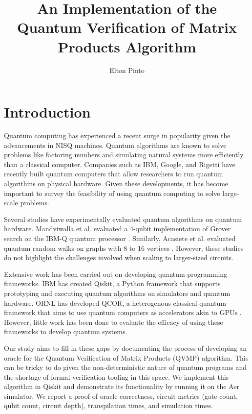 \documentclass[11pt]{article}
\title{An Implementation of the Quantum Verification of Matrix Products Algorithm}
\author{Elton Pinto}
\date{}
\theoremstyle{definition}
\theoremstyle{remark}
\begin{document}
\maketitle

\section{Introduction}

Quantum computing has experienced a recent surge in popularity given the
advancements in NISQ machines. Quantum algorithms are known to solve problems
like factoring numbers and simulating natural systems more efficiently than a
classical computer. Companies such as IBM, Google, and Rigetti have recently
built quantum computers that allow researchers to run quantum algorithms on
physical hardware. Given these developments, it has become important to survey
the feasibility of using quantum computing to solve large-scale problems.

Several studies have experimentally evaluated quantum algorithms on quantum
hardware. Mandviwalla et al. evaluated a 4-qubit implementation of Grover
search on the IBM-Q quantum processor \cite{mandviwalla2018implementing}.
Similarly, Acasiete et al. evaluated quantum random walks on graphs with 8 to
16 vertices \cite{acasiete2020implementation}. However, these studies do not
highlight the challenges involved when scaling to larger-sized circuits.

Extensive work has been carried out on developing quantum programming
frameworks. IBM has created Qiskit, a Python framework that supports prototyping
and executing quantum algorithms on simulators and quantum hardware. ORNL has
developed QCOR, a heterogenous classical-quantum framework that aims to use
quantum computers as accelerators akin to GPUs \cite{mintz2020qcor}. However,
little work has been done to evaluate the efficacy of using these frameworks to
develop quantum systems.

Our study aims to fill in these gaps by documenting the process of developing an
oracle for the Quantum Verification of Matrix Products (QVMP)
\cite{buhrman2005quantum}\cite{ambainis2002quantummatrix} algorithm. This can be
tricky to do given the non-deterministic nature of quantum programs and the
shortage of formal verification tooling in this space. We implement this
algorithm in Qiskit and demonstrate its functionality by running it on the Aer
simulator. We report a proof of oracle correctness, circuit metrics (gate count,
qubit count, circuit depth), transpilation times, and simulation times.
\end{document}
